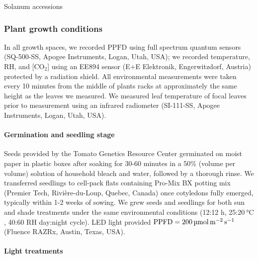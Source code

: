 \documentclass[
  letterpaper,
  DIV=11,
  numbers=noendperiod]{scrartcl}
\let\oldparagraph\paragraph
\renewcommand{\paragraph}[1]{\oldparagraph{#1}\mbox{}}
\begin{document}
\begin{table}

\caption{\label{tbl-accessions}Solanum accessions}

\centering{

}

\end{table}%

\subsubsection{Plant growth conditions}\label{plant-growth-conditions}

In all growth spaces, we recorded \(\mathrm{PPFD}\) using full spectrum
quantum sensors (SQ-500-SS, Apogee Instruments, Logan, Utah, USA); we
recorded temperature, RH, and {[}CO\(_2\){]} using an EE894 sensor (E+E
Elektronik, Engerwitzdorf, Austria) protected by a radiation shield. All
environmental measurements were taken every 10 minutes from the middle
of plants racks at approximately the same height as the leaves we
measured. We measured leaf temperature of focal leaves prior to
measurement using an infrared radiometer (SI-111-SS, Apogee Instruments,
Logan, Utah, USA).

\paragraph{Germination and seedling
stage}\label{germination-and-seedling-stage}

Seeds provided by the Tomato Genetics Resource Center germinated on
moist paper in plastic boxes after soaking for 30-60 minutes in a 50\%
(volume per volume) solution of household bleach and water, followed by
a thorough rinse. We transferred seedlings to cell-pack flats containing
Pro-Mix BX potting mix (Premier Tech, Rivière-du-Loup, Quebec, Canada)
once cotyledons fully emerged, typically within 1-2 weeks of sowing. We
grew seeds and seedlings for both sun and shade treatments under the
same environmental conditions (12:12 h, 25:\(\qty{20}{\degreeCelsius}\),
40:60 RH day:night cycle). LED light provided
\(\mathrm{PPFD} = \qty{200}{\micro\mol\raiseto{-2}\meter\raiseto{-1}\second}\)
(Fluence RAZRx, Austin, Texas, USA).

\paragraph{Light treatments}\label{light-treatments}
\end{document}
